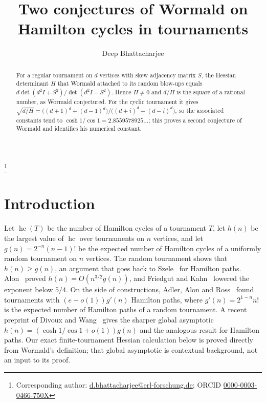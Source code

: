 \documentclass[11pt]{amsart}
\theoremstyle{remark}
\numberwithin{equation}{section}
\newcommand{\hc}{\operatorname{hc}}
\begin{document}
\title[Two conjectures of Wormald]{Two conjectures of Wormald on Hamilton cycles in tournaments}

\author{Deep Bhattacharjee}
\address{Formerly, Electro-Gravitational Space Propulsion Laboratory (EGSPL),\newline Bhubaneswar, Odisha 751030, India}
\thanks{Corresponding author: \href{mailto:d.bhattacharjee@erl-forschung.de}{d.bhattacharjee@erl-forschung.de}; ORCID \href{https://orcid.org/0000-0003-0466-750X}{\mbox{0000-0003-0466-750X}}}


\begin{abstract}
For a regular tournament on $d$ vertices with skew adjacency matrix $S$, the Hessian determinant $H$ that Wormald attached to its random blow-ups equals $d\det(d^2I+S^2)/\det(d^2I-S^2)$. Hence $H\neq0$ and $d/H$ is the square of a rational number, as Wormald conjectured. For the cyclic tournament it gives $\sqrt{d/H}=\bigl((d+1)^d+(d-1)^d\bigr)/\bigl((d+i)^d+(d-i)^d\bigr)$, so the associated constants tend to $\cosh 1/\cos 1=2.8559578925\ldots$; this proves a second conjecture of Wormald and identifies his numerical constant.
\end{abstract}

\maketitle

\section{Introduction}

Let $\hc(T)$ be the number of Hamilton cycles of a tournament $T$, let $h(n)$ be the largest value of $\hc$ over tournaments on $n$ vertices, and let $g(n)=2^{-n}(n-1)!$ be the expected number of Hamilton cycles of a uniformly random tournament on $n$ vertices. The random tournament shows that $h(n)\ge g(n)$, an argument that goes back to Szele~\cite{Sz} for Hamilton paths. Alon~\cite{Al} proved $h(n)=O(n^{3/2}g(n))$, and Friedgut and Kahn~\cite{FK} lowered the exponent below $5/4$. On the side of constructions, Adler, Alon and Ross~\cite{AAR} found tournaments with $(e-o(1))g'(n)$ Hamilton paths, where $g'(n)=2^{1-n}n!$ is the expected number of Hamilton paths of a random tournament. A recent preprint of Divoux and Wang~\cite{DW} gives the sharper global asymptotic $h(n)=(\cosh1/\cos1+o(1))g(n)$ and the analogous result for Hamilton paths. Our exact finite-tournament Hessian calculation below is proved directly from Wormald's definition; that global asymptotic is contextual background, not an input to its proof.
\end{document}

